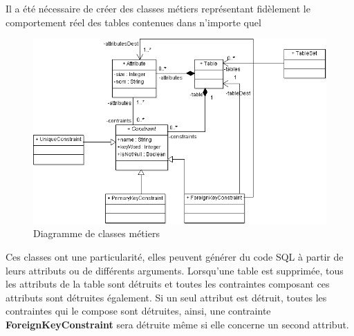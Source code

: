 Il a été nécessaire de créer des classes métiers représentant fidèlement le comportement réel des tables contenues dans n'importe quel \sgbd

\begin{figure}[H]
\includegraphics[width=15cm]{images/metier.png}
\caption{Diagramme de classes métiers}
\label{classes_metiers}
\end{figure}


Ces classes ont une particularité, elles peuvent générer du code SQL à partir de leurs attributs ou de différents arguments.
Lorsqu'une table est supprimée, tous les attributs de la table sont détruits et toutes les contraintes composant ces attributs sont détruites également.
Si un seul attribut est détruit, toutes les contraintes qui le compose sont détruites, ainsi, une contrainte \textbf{ForeignKeyConstraint} sera détruite même si elle concerne un second attribut.
